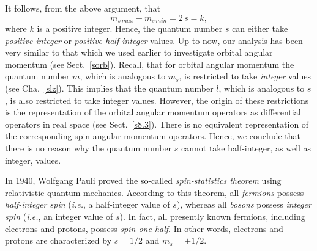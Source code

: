 It follows, from the above argument, that
\begin{equation}
m_{s\,max}-m_{s\,min} = 2\,s = k,
\end{equation}
where $k$ is a positive integer. Hence, the quantum number $s$
can either take {\em positive integer}\/ or {\em positive half-integer}\/ values.
Up to now, our analysis has been very similar to that which we used earlier to investigate orbital
angular momentum (see Sect.~\ref{sorb}). Recall, that for orbital angular momentum the quantum number $m$, which is analogous to $m_s$,
is restricted to take {\em integer}\/ values (see Cha.~\ref{slz}). This implies
that the quantum number $l$, which is analogous to $s$, is also
restricted to take integer values.
However,
the origin of these restrictions is the representation of the orbital
angular momentum operators as differential operators in real space
(see Sect.~\ref{s8.3}). There is no equivalent representation of the
corresponding spin angular momentum operators. Hence, we conclude
that there is no reason why the quantum number $s$ cannot take half-integer,
as well as integer, values.

In 1940, Wolfgang Pauli proved the so-called {\em spin-statistics theorem}\/
using relativistic quantum mechanics. According to this theorem, all
{\em fermions}\/ possess {\em half-integer spin}\/ ({\em i.e.}, a half-integer value of $s$),
whereas all {\em bosons}\/ possess {\em integer spin}\/ ({\em i.e.}, an integer value of $s$). In fact, all presently known
fermions, including electrons and protons, possess {\em spin one-half}. In other words,
electrons and protons are characterized by $s=1/2$ and $m_s=\pm 1/2$.

